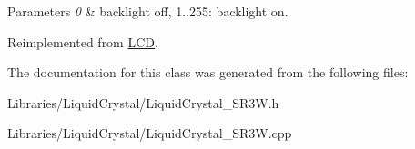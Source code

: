 \begin{DoxyParams}{Parameters}
{\em 0} & backlight off, 1..255\+: backlight on. \\
\hline
\end{DoxyParams}


Reimplemented from \hyperlink{class_l_c_d_a53f4ee9b39d9ab3d7ae4d9f8dedca3bc}{L\+C\+D}.



The documentation for this class was generated from the following files\+:\begin{DoxyCompactItemize}
\item 
Libraries/\+Liquid\+Crystal/Liquid\+Crystal\+\_\+\+S\+R3\+W.\+h\item 
Libraries/\+Liquid\+Crystal/Liquid\+Crystal\+\_\+\+S\+R3\+W.\+cpp\end{DoxyCompactItemize}
